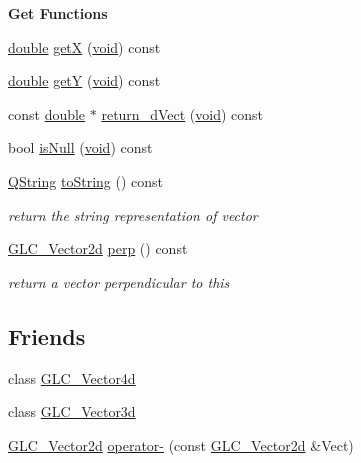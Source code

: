 \begin{Indent}{\bf Get Functions}\par
\begin{DoxyCompactItemize}
\item 
\hyperlink{_super_l_u_support_8h_a8956b2b9f49bf918deed98379d159ca7}{double} \hyperlink{class_g_l_c___vector2d_a54fbd58349ae7d1ad647fdf790fd0f0b}{get\-X} (\hyperlink{group___u_a_v_objects_plugin_ga444cf2ff3f0ecbe028adce838d373f5c}{void}) const 
\item 
\hyperlink{_super_l_u_support_8h_a8956b2b9f49bf918deed98379d159ca7}{double} \hyperlink{class_g_l_c___vector2d_a374b54050e92cd2bd3e14502c8b007f3}{get\-Y} (\hyperlink{group___u_a_v_objects_plugin_ga444cf2ff3f0ecbe028adce838d373f5c}{void}) const 
\item 
const \hyperlink{_super_l_u_support_8h_a8956b2b9f49bf918deed98379d159ca7}{double} $\ast$ \hyperlink{class_g_l_c___vector2d_aba493919b2e595af2aa1d75a9e1d2c36}{return\-\_\-d\-Vect} (\hyperlink{group___u_a_v_objects_plugin_ga444cf2ff3f0ecbe028adce838d373f5c}{void}) const 
\item 
bool \hyperlink{class_g_l_c___vector2d_af31864c84fa4d2e64fedfcce85eacf68}{is\-Null} (\hyperlink{group___u_a_v_objects_plugin_ga444cf2ff3f0ecbe028adce838d373f5c}{void}) const 
\item 
\hyperlink{group___u_a_v_objects_plugin_gab9d252f49c333c94a72f97ce3105a32d}{Q\-String} \hyperlink{class_g_l_c___vector2d_ab57c6fdcec29436c2368e9f4e9df65d0}{to\-String} () const 
\begin{DoxyCompactList}\small\item\em return the string representation of vector \end{DoxyCompactList}\item 
\hyperlink{class_g_l_c___vector2d}{G\-L\-C\-\_\-\-Vector2d} \hyperlink{class_g_l_c___vector2d_a5a253e69645f8c9437d3573cecc66060}{perp} () const 
\begin{DoxyCompactList}\small\item\em return a vector perpendicular to this \end{DoxyCompactList}\end{DoxyCompactItemize}
\end{Indent}
\subsection*{Friends}
\begin{DoxyCompactItemize}
\item 
class \hyperlink{class_g_l_c___vector2d_a7f0b47b2a85e893a6b383b7242361028}{G\-L\-C\-\_\-\-Vector4d}
\item 
class \hyperlink{class_g_l_c___vector2d_a12e30aa3c4b9461968961178e9c38b10}{G\-L\-C\-\_\-\-Vector3d}
\item 
\hyperlink{class_g_l_c___vector2d}{G\-L\-C\-\_\-\-Vector2d} \hyperlink{class_g_l_c___vector2d_a6fa4a76d37a8b67bf269a7205aeee3a5}{operator-\/} (const \hyperlink{class_g_l_c___vector2d}{G\-L\-C\-\_\-\-Vector2d} \&Vect)
\end{DoxyCompactItemize}


